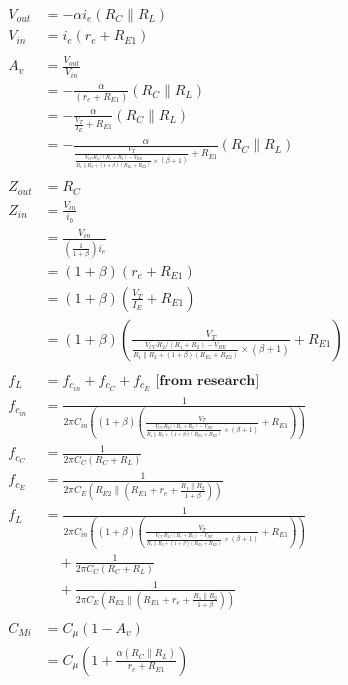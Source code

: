 \documentclass[11pt, a4paper]{article}
\begin{document}
\begin{align*}
    V_{out} &= -\alpha i_e (R_C \parallel R_L)\\
    V_{in} &= i_e (r_e+R_{E1})\\ \\
    A_v &= \frac{V_{out}}{V_{in}}\\
    &= -\frac{\alpha}{(r_e+R_{E1})}(R_C \parallel R_L)\\
    &= -\frac{\alpha}{\frac{V_T}{I_E}+R_{E1}}(R_C \parallel R_L)\\
    &= -\frac{\alpha}{\frac{V_T}{\frac{V_{CC}R_2/(R_1+R_2)-V_{BE}}{R_1 \parallel R_2 + (1+\beta)(R_{E1}+R_{E2})} \times (\beta + 1)}+R_{E1}}(R_C \parallel R_L)\\ \\
 Z_{out} &= R_C \\
 Z_{in} &= \frac{V_{in}}{i_b} \\
 &= \frac{V_{in}}{(\frac{1}{1+\beta})i_e}\\
 & = (1+\beta) (r_e + R_{E1})\\
 & = (1+\beta) (\frac{V_T}{I_E} + R_{E1})\\
 & = (1+\beta) (\frac{V_T}{\frac{V_{CC}R_2/(R_1+R_2)-V_{BE}}{R_1 \parallel R_2 + (1+\beta)(R_{E1}+R_{E2})} \times (\beta + 1)} + R_{E1})\\ \\
f_L &= f_{c_{in}} + f_{c_C} + f_{c_E} \textbf{ [from research]}\\
f_{c_{in}} &= \frac{1}{2\pi C_{in} ((1+\beta) (\frac{V_T}{\frac{V_{CC}R_2/(R_1+R_2)-V_{BE}}{R_1 \parallel R_2 + (1+\beta)(R_{E1}+R_{E2})} \times (\beta + 1)} + R_{E1}))}\\
f_{c_C} &= \frac{1}{2\pi C_C (R_C + R_L)}\\
f_{c_E} &= \frac{1}{2\pi C_E \left(R_{E2} \parallel \left(R_{E1} + r_e + \frac{R_1 \parallel R_2}{1+\beta}\right)\right)}\\
f_L &= \frac{1}{2\pi C_{in} ((1+\beta) (\frac{V_T}{\frac{V_{CC}R_2/(R_1+R_2)-V_{BE}}{R_1 \parallel R_2 + (1+\beta)(R_{E1}+R_{E2})} \times (\beta + 1)} + R_{E1}))}\\ &\quad + \frac{1}{2\pi C_C (R_C + R_L)}\\ &\quad + \frac{1}{2\pi C_E \left(R_{E2} \parallel \left(R_{E1} + r_e + \frac{R_1 \parallel R_2}{1+\beta}\right)\right)} \\ \\
C_{Mi} &= C_\mu (1 - A_v)\\
&= C_\mu \left(1 + \frac{\alpha(R_C \parallel R_L)}{r_e + R_{E1}}\right)\\

\end{align*}
\end{document}
